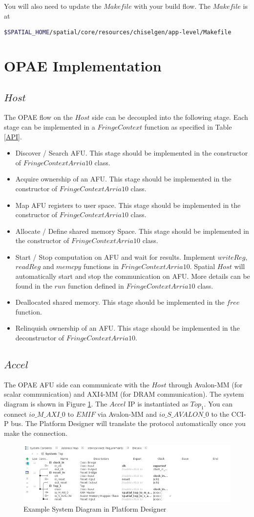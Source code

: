 \documentclass{article}
\begin{document}
You will also need to update the $Makefile$ with your build flow. The $Makefile$ is at
\begin{lstlisting}[language=bash]
$SPATIAL_HOME/spatial/core/resources/chiselgen/app-level/Makefile
\end{lstlisting}

\section{OPAE Implementation}
\subsection{$Host$}
The OPAE flow on the $Host$ side can be decoupled into the following stage.
Each stage can be implemented in a $FringeContext$ function as specified in Table \ref{API}.
\begin{itemize}
    \item Discover / Search AFU.
        This stage should be implemented in the constructor of $FringeContextArria10$ class.
    \item Acquire ownership of an AFU.
        This stage should be implemented in the constructor of $FringeContextArria10$ class.
    \item Map AFU registers to user space.
        This stage should be implemented in the constructor of $FringeContextArria10$ class.
    \item Allocate / Define shared memory Space.
        This stage should be implemented in the constructor of $FringeContextArria10$ class.
    \item Start / Stop computation on AFU and wait for results.
        Implement $writeReg$, $readReg$ and $memcpy$ functions in $FringeContextArria10$.
        Spatial $Host$ will automatically start and stop the communication on AFU.
        More details can be found in the $run$ function defined in $FringeContextArria10$ class.
    \item Deallocated shared memory.
        This stage should be implemented in the $free$ function.
    \item Relinquish ownership of an AFU.
        This stage should be implemented in the deconstructor of $FringeContextArria10$.
\end{itemize}

\subsection{$Accel$}
The OPAE AFU side can communicate with the $Host$ through Avalon-MM (for scalar communication) and 
AXI4-MM (for DRAM communication).
The system diagram is shown in Figure \ref{fig:sys}.
The $Accel$ IP is instantiated as $Top_1$.
You can connect $io\_M\_AXI\_0$ to $EMIF$ via Avalon-MM and $io\_S\_AVALON\_0$ to the CCI-P bus. 
The Platform Designer will translate the protocol automatically once you make the connection.

\begin{figure}
\centering
\includegraphics[scale=0.45]{accel.png}
\caption{Example System Diagram in Platform Designer}
\label{fig:sys}
\end{figure}
\end{document}
